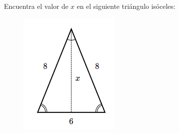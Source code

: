 Encuentra el valor de $x$ en el siguiente triángulo isóceles:

\begin{figure}[H]
    \centering
    \includegraphics[width=0.2\linewidth]{../images/pitagoras0.png}
    \caption{}
    \label{fig:pitagoras0}
\end{figure}
